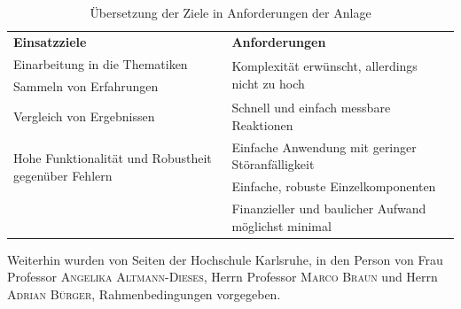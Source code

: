 \begin{table}[H]
\centering
\small
\renewcommand{\arraystretch}{1.3}
\begin{tabularx}{1\textwidth}{m{}m{}}

\toprule

\textbf{Einsatzziele} & \textbf{Anforderungen} \\

\cmidrule[0.5pt](r{0.25em}){1-1} 
\cmidrule[0.5pt](l{0.25em}){2-2}

Einarbeitung in die Thematiken	& \multirow{2}{\hsize}{Komplexität erwünscht, allerdings nicht zu hoch}  \\

\cmidrule[0.1pt](lr{2em}){1-1} 

Sammeln von Erfahrungen							&					\\

\cmidrule[0.5pt](r{0.25em}){1-1} 
\cmidrule[0.5pt](l{0.25em}){2-2}

Vergleich von Ergebnissen		& Schnell und einfach messbare Reaktionen      \\
\cmidrule[0.5pt](r{0.25em}){1-1} 
\cmidrule[0.5pt](l{0.25em}){2-2}

\multirow{2}{\hsize}{Hohe Funktionalität und Robustheit gegenüber Fehlern} & Einfache Anwendung mit geringer Störanfälligkeit\\
\cmidrule[0.1pt](lr{2em}){2-2} 

 & Einfache, robuste Einzelkomponenten \\
 
\cmidrule[0.5pt](r{0.25em}){1-1} 
\cmidrule[0.5pt](l{0.25em}){2-2}

 & Finanzieller und baulicher Aufwand möglichst minimal \\

\bottomrule
\end{tabularx}
\caption{Übersetzung der Ziele in Anforderungen der Anlage}
\label{tab:anforderungen_umgebung}
\end{table}


Weiterhin wurden von Seiten der Hochschule Karlsruhe, in den Person von Frau Professor \textsc{Angelika Altmann-Dieses}, Herrn Professor \textsc{Marco Braun} und Herrn \textsc{Adrian Bürger}, Rahmenbedingungen vorgegeben.

